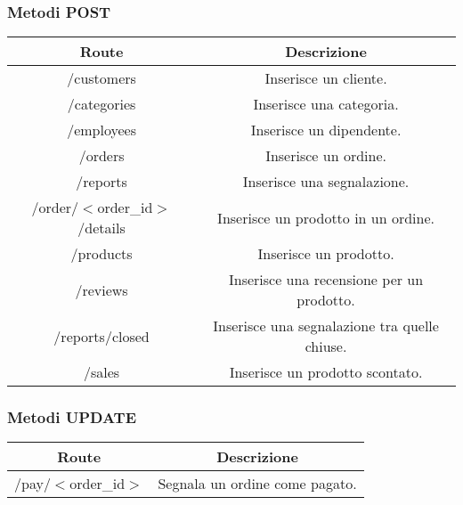 \subsubsection{Metodi POST}
\begin{center}
\begin{tabular}{|c|c|}
\hline
Route & Descrizione\\
\hline
\multirow{2}{20em}{/customers} & \multirow{2}{15em}{Inserisce un cliente.}\\
 & \\
\hline
\multirow{2}{20em}{/categories} & \multirow{2}{15em}{ Inserisce una categoria.}\\
 & \\
\hline
\multirow{2}{20em}{/employees} & \multirow{2}{15em}{Inserisce un dipendente.}\\
 & \\
\hline
\multirow{2}{20em}{/orders} & \multirow{2}{15em}{Inserisce un ordine.}\\
 & \\
\hline
\multirow{2}{20em}{/reports} & \multirow{2}{15em}{Inserisce una segnalazione.}\\
 & \\
\hline
\multirow{2}{20em}{/order/$<$order\_id$>$/details} & \multirow{2}{15em}{Inserisce un prodotto in un ordine.}\\
 & \\
\hline
\multirow{2}{20em}{/products} & \multirow{2}{15em}{Inserisce un prodotto.}\\
 & \\
\hline
\multirow{2}{20em}{/reviews} & \multirow{2}{15em}{Inserisce una recensione per un prodotto.}\\
 & \\
\hline
\multirow{2}{20em}{/reports/closed} & \multirow{2}{15em}{Inserisce una segnalazione tra quelle chiuse.}\\
 & \\
\hline
\multirow{2}{20em}{/sales} & \multirow{2}{15em}{Inserisce un prodotto scontato.}\\
 & \\
\hline
\end{tabular}
\end{center}

\subsubsection{Metodi UPDATE}
\begin{center}
\begin{tabular}{|c|c|}
\hline
Route & Descrizione \\
\hline
\multirow{2}{20em}{/pay/$<$order\_id$>$} & \multirow{2}{15em}{Segnala un ordine come pagato.}\\
 & \\
 \hline
\end{tabular}
\end{center}

